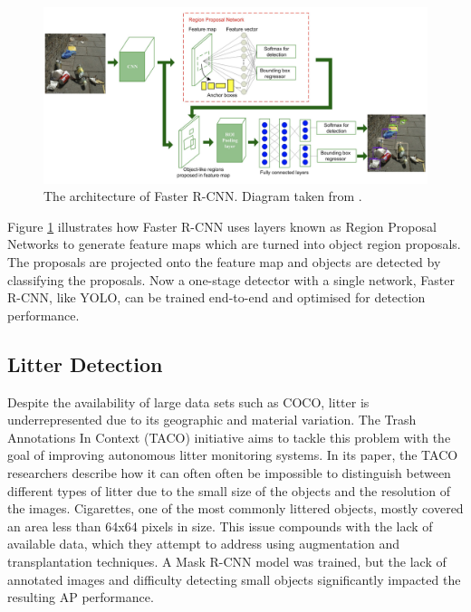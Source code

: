 \documentclass{thesis}
\begin{document}
\begin{figure}[h]
    \centering
    \includegraphics[scale=0.5]{images/faster-rcnn-architecture.png}
    \caption{The architecture of Faster R-CNN. Diagram taken from \cite{smart-street}.}
    \label{fig:faster-rcnn-architecture}
\end{figure}

Figure \ref{fig:faster-rcnn-architecture} illustrates how Faster R-CNN uses layers known as Region Proposal Networks to generate feature maps which are turned into object region proposals. The proposals are projected onto the feature map and objects are detected by classifying the proposals. Now a one-stage detector with a single network, Faster R-CNN, like YOLO\cite{yolov1}, can be trained end-to-end and optimised for detection performance.

\subsection{Litter Detection}

Despite the availability of large data sets such as COCO\cite{lin2015microsoft}, litter is underrepresented due to its geographic and material variation. The Trash Annotations In Context (TACO) initiative aims to tackle this problem with the goal of improving autonomous litter monitoring systems\cite{DBLP:journals/corr/abs-2003-06975}. In its paper, the TACO researchers describe how it can often often be impossible to distinguish between different types of litter due to the small size of the objects and the resolution of the images. Cigarettes, one of the most commonly littered objects, mostly covered an area less than 64x64 pixels in size. This issue compounds with the lack of available data, which they attempt to address using augmentation and transplantation techniques. A Mask R-CNN model was trained, but the lack of annotated images and difficulty detecting small objects significantly impacted the resulting AP performance.
\end{document}
